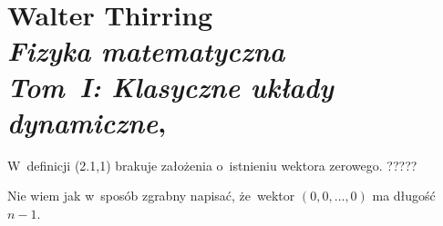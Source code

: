\documentclass[a4paper,11pt]{article}
\numberwithin{equation}{section}
\begin{document}
\section{Walter Thirring \\
  \textit{Fizyka matematyczna} \\
  \textit{Tom~I: Klasyczne układy dynamiczne},
  \cite{ThirringFizykaMatematycznaVolI1985}}


\vspace{0em}



\vspace{0em}


\noindent
{} W~definicji (2.1,1) brakuje założenia o~istnieniu wektora zerowego. ?????

\VerSpaceFour




\noindent
{} Nie wiem jak w~sposób zgrabny napisać, że~wektor
$( 0, 0, \ldots, 0 )$ ma długość $n - 1$.





\newpage

\end{document}
